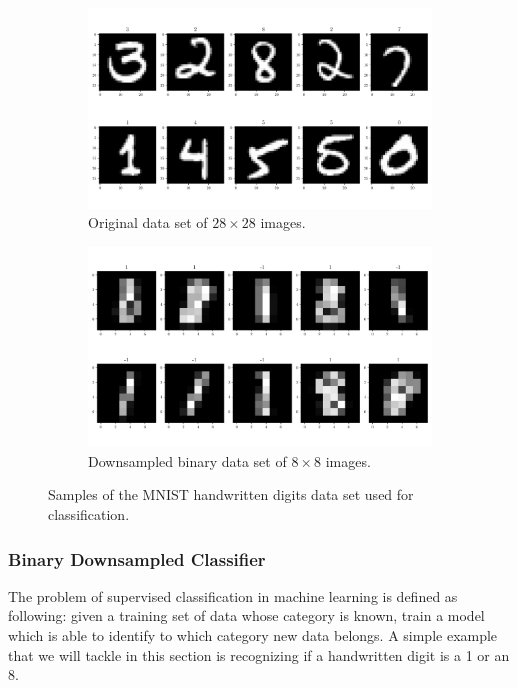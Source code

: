\documentclass[a4paper,10pt]{article}
\begin{document}
\begin{figure}[ht]
	\centering
	\begin{subfigure}{.5\textwidth}
		\centering
		\includegraphics[width=.925\linewidth]{figures/mnist_28x28.pdf}
		\caption{Original data set of $28 \times 28$ images.}
		\label{fig:mnist_28x28}
	\end{subfigure}%
	\begin{subfigure}{.5\textwidth}
		\centering
		\includegraphics[width=.925\linewidth]{figures/mnist_8x8.pdf}
		\caption{Downsampled binary data set of $8 \times 8$ images.}
		\label{fig:mnist_8x8}
	\end{subfigure}
	\caption{Samples of the MNIST handwritten digits data set used for classification.}
	\label{fig:mnist}
\end{figure}

\subsubsection{Binary Downsampled Classifier} \label{sec:bdc}
The problem of supervised classification in machine learning is defined as following: given a training set of data whose category is known, train a model which is able to identify to which category new data belongs.
A simple example that we will tackle in this section is recognizing if a handwritten digit is a 1 or an 8.
\end{document}
